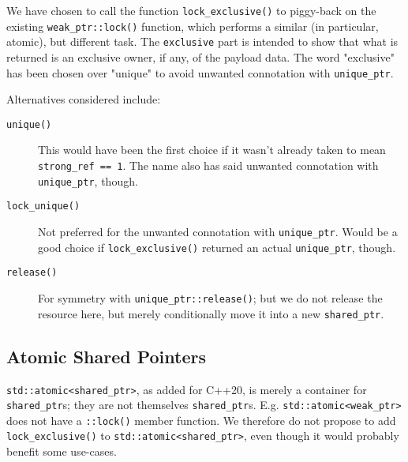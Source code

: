 \documentclass[11pt]{article}
\newcommand{\lockx}{\texttt{lock\_exclusive()}}
\newcommand{\uptr}{\texttt{unique\_ptr}}
\newcommand{\wptr}{\texttt{weak\_ptr}}
\newcommand{\sptr}{\texttt{shared\_ptr}}
\begin{document}
We have chosen to call the function \lockx{} to piggy-back on the
existing \texttt{\wptr::lock()} function, which performs a similar (in
particular, atomic), but different task. The \texttt{exclusive} part
is intended to show that what is returned is an exclusive owner, if
any, of the payload data. The word "exclusive" has been chosen over
"unique" to avoid unwanted connotation with \uptr.

Alternatives considered include:

\begin{description}
\item[\texttt{unique()}] This would have been the first choice if it
  wasn't already taken to mean \texttt{strong\_ref == 1}. The name
  also has said unwanted connotation with \uptr, though.
\item[\texttt{lock\_unique()}] Not preferred for the unwanted
  connotation with \uptr{}. Would be a good choice if \lockx{}
  returned an actual \uptr{}, though.
\item[\texttt{release()}] For symmetry with \texttt{\uptr::release()};
  but we do not release the resource here, but merely
  conditionally move it into a new \sptr{}.
\end{description}

\subsection{Atomic Shared Pointers}

\texttt{std::atomic<shared\_ptr>}, as added for C++20, is merely
a container for \sptr{}s; they are not themselves
\sptr{}s. E.g. \texttt{std::atomic<weak\_ptr>} does not have a
\texttt{::lock()} member function. We therefore do not propose to add
\lockx{} to \texttt{std::atomic<shared\_ptr>}, even though it would
probably benefit some use-cases.

\iffalse
\section{Acknowledgements}
\fi
\end{document}
